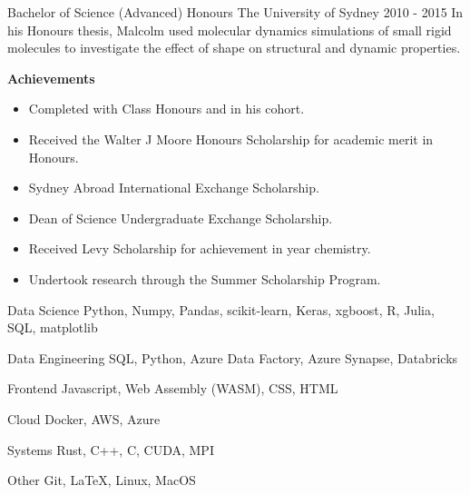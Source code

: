 \begin{cventry}
  {Bachelor of Science (Advanced) Honours} %
  {The University of Sydney} %
  {} %
  {2010 - 2015} %
  In his Honours thesis,
  Malcolm used molecular dynamics simulations of small rigid molecules
  to investigate the effect of shape on structural and dynamic properties.

  \textbf{Achievements}
  \begin{itemize}
    \item Completed with  Class Honours and  in his cohort.
    \item Received the Walter J Moore Honours Scholarship for academic merit in Honours.
    \item Sydney Abroad International Exchange Scholarship.
    \item Dean of Science Undergraduate Exchange Scholarship.
    \item Received Levy Scholarship for achievement in  year chemistry.
    \item Undertook research through the Summer Scholarship Program.
  \end{itemize}
\end{cventry}


\begin{cvskills}

\cvskill
  {Data Science} %
  {Python, Numpy, Pandas, scikit-learn, Keras, xgboost, R, Julia, SQL, matplotlib}

\cvskill
  {Data Engineering} %
  {SQL, Python, Azure Data Factory, Azure Synapse, Databricks}


\cvskill
  {Frontend} %
  {Javascript, Web Assembly (WASM), CSS, HTML}

\cvskill
  {Cloud} %
  {Docker, AWS, Azure}

\cvskill
  {Systems} %
  {Rust, C++, C, CUDA, MPI}

\cvskill
  {Other} %
  {Git, \LaTeX, Linux, MacOS}

\end{cvskills}
